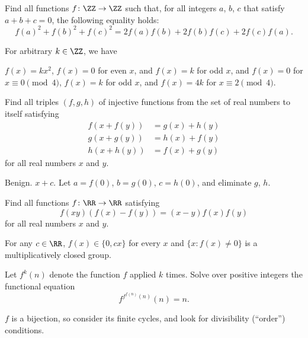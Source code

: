 \documentclass[11pt]{scrartcl}
\begin{document}
\begin{problem}
  [IMO 2012/4]
  Find all functions $f \colon \ZZ \to \ZZ$ such that,
  for all integers $a$, $b$, $c$ that satisfy $a+b+c=0$,
  the following equality holds:
  \[ f(a)^2+f(b)^2+f(c)^2 = 2f(a)f(b)+2f(b)f(c)+2f(c)f(a). \]
  \begin{hint}
    For arbitrary $k \in \ZZ$, we have
    \begin{enumerate}[(i)]
      \ii $f(x) = kx^2$,
      \ii $f(x) = 0$ for even $x$, and $f(x) = k$ for odd $x$, and
      \ii $f(x) = 0$ for $x \equiv 0 \pmod 4$, $f(x) = k$ for odd $x$, and $f(x) = 4k$ for $x \equiv 2 \pmod 4$.
    \end{enumerate}
  \end{hint}
\end{problem}

\begin{problem}
  [ELMO 2014]
  Find all triples $(f,g,h)$ of injective functions from the set of real numbers to itself satisfying
  \begin{align*}
    f(x+f(y)) &= g(x) + h(y) \\
    g(x+g(y)) &= h(x) + f(y) \\
    h(x+h(y)) &= f(x) + g(y)
  \end{align*}
  for all real numbers $x$ and $y$.
  \begin{hint}
    Benign. $x+c$.
    Let $a=f(0)$, $b=g(0)$, $c=h(0)$, and eliminate $g$, $h$.
  \end{hint}
\end{problem}

\begin{problem}
  [Shortlist 2001 A4]
  Find all functions $f \colon \RR \to \RR$ satisfying
  \[ f(xy)(f(x) - f(y)) = (x-y)f(x)f(y) \]
  for all real numbers $x$ and $y$.
  \label{prob:group}
  \begin{hint}
    For any $c \in \RR$, $f(x) \in \{0,cx\}$ for every $x$
    and $\{ x : f(x) \neq 0 \}$ is a multiplicatively closed group.
  \end{hint}
\end{problem}

\begin{problem}
  \label{prob:fff}
  Let $f^k(n)$ denote the function $f$ applied $k$ times.
  Solve over positive integers the functional equation
  \[ f^{f^{f(n)}(n)}(n) = n. \]
  \begin{hint}
    $f$ is a bijection, so consider its finite cycles,
    and look for divisibility (``order'') conditions.
  \end{hint}
\end{problem}
\end{document}

